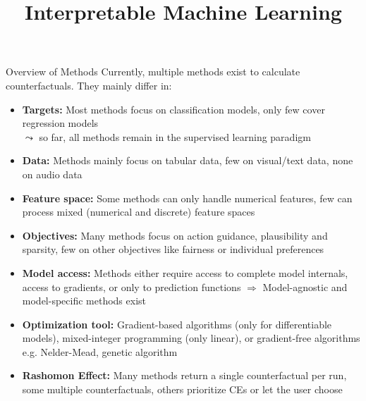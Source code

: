 \documentclass[11pt,compress,t,notes=noshow, aspectratio=169, xcolor=table]{beamer}
\title{Interpretable Machine Learning}
\date{}
\begin{document}
	
	
	
	
	
	
	\newcommand{\titlefigure}{figure/counterfactuals_heat.png}
    \newcommand{\learninggoals}{
    	\item See two strategies to generate CEs
    	\item Know problems and limitations of CEs}
	
	


\begin{frame}{Overview of Methods}
	Currently, multiple methods exist to calculate counterfactuals. They mainly differ in: 
	\begin{itemize}[<+->]
		\item \textbf{Targets:} Most methods focus on classification models, only few cover regression models\\
		$\leadsto$ so far, all methods remain in the supervised learning paradigm
		\item \textbf{Data:} Methods mainly focus on tabular data, few on visual/text data, none on audio data
		\item \textbf{Feature space:} Some methods can only handle numerical features, few can process mixed (numerical and discrete) feature spaces
		\item \textbf{Objectives:} Many methods focus on action guidance, plausibility and sparsity, few on other objectives like fairness or individual preferences
		\item \textbf{Model access:} Methods either require access to complete model internals, access to gradients, or only to prediction functions $\Rightarrow$ Model-agnostic and model-specific methods exist
		\item \textbf{Optimization tool:} Gradient-based algorithms (only for differentiable models), mixed-integer programming (only linear), or gradient-free algorithms e.g. Nelder-Mead, genetic algorithm
		\item \textbf{Rashomon Effect:} Many methods return a single counterfactual per run, some multiple counterfactuals, others prioritize CEs or let the user choose
	\end{itemize}
\end{frame}
\end{document}
